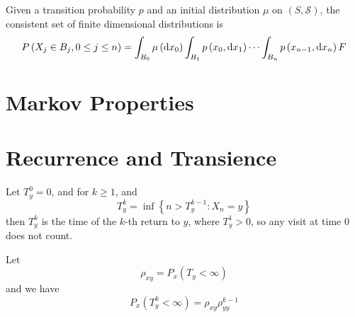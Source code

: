 \begin{remark}
	Given a transition probability \(p\) and an initial distribution \(\mu\) on \((S,\mathcal{S})\), the consistent set of finite dimensional distributions is
	\begin{equation}
		P\left(X_{j}\in B_{j},0\leq j\leq n\right)=\int_{B_{0}}\mu\left(\mathop{}\!\mathrm{d} x_{0}\right)\int_{B_{1}}p\left(x_{0},\mathop{}\!\mathrm{d} x_{1}\right)\cdots\int_{B_{n}}p\left(x_{n-1},\mathop{}\!\mathrm{d} x_{n}\right)
		F    \end{equation}
\end{remark}

\section{Markov Properties}

\begin{definition}

\end{definition}

\begin{theorem}

\end{theorem}

\begin{corollary}

\end{corollary}

\begin{theorem}

\end{theorem}

\section{Recurrence and Transience}

Let \(T_{y}^{0}=0\), and for \(k\geq 1\), and
\begin{equation}
	T_{y}^{k}=\inf\left\{n>T_{y}^{k-1}:X_{n}=y\right\}
\end{equation}
then \(T_{y}^{k}\) is the time of the \(k\)-th return to \(y\), where \(T_{y}^{1}>0\), so any visit at time 0 does not count.

Let
\begin{equation}
	\rho_{x y}=P_{x}\left(T_{y}<\infty\right)
\end{equation}
and we have
\begin{equation}
	P_{x}\left(T_{y}^{k}<\infty\right)=\rho_{xy}\rho_{yy}^{k-1}
\end{equation}

